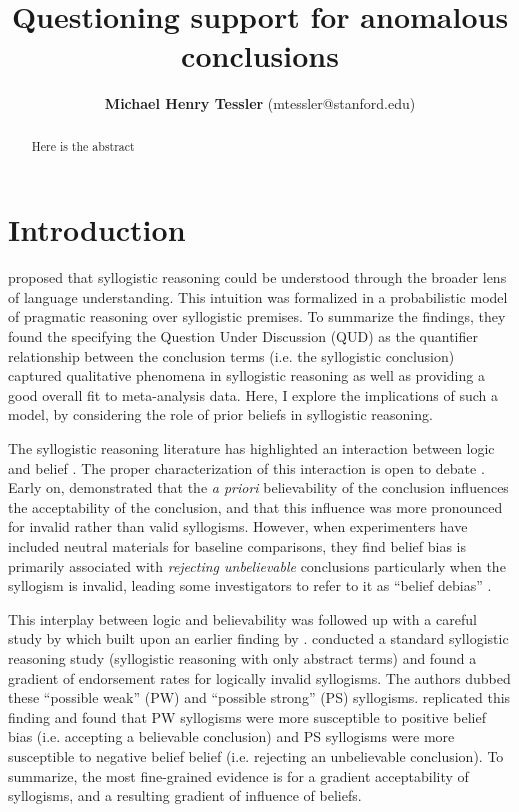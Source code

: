 \documentclass{llncs} %
\title{Questioning support for anomalous conclusions}
\author{{\large \bf Michael Henry Tessler} (mtessler@stanford.edu)}
\institute{Department of Psychology, Stanford University}
\begin{document}
\maketitle


\begin{abstract}
Here is the abstract
\end{abstract}

\section{Introduction}

 proposed that syllogistic reasoning could be understood through the broader lens of language understanding. This intuition was formalized in a probabilistic model of pragmatic reasoning over syllogistic premises. To summarize the findings, they found the specifying the Question Under Discussion (QUD) as the quantifier relationship between the conclusion terms (i.e. the syllogistic conclusion) captured qualitative phenomena in syllogistic reasoning as well as providing a good overall fit to meta-analysis data. Here, I explore the implications of such a model, by considering the role of prior beliefs in syllogistic reasoning.

The syllogistic reasoning literature has highlighted an interaction between logic and belief \cite{Evans1983}. The proper characterization  of this interaction is open to debate \cite{Newstead1993, others}. Early on,  demonstrated that the \emph{a priori} believability of the conclusion influences the acceptability of the conclusion, and that this influence was more pronounced for invalid rather than valid syllogisms. However, when experimenters have included neutral materials for baseline comparisons, they find belief bias is primarily associated with \emph{rejecting unbelievable} conclusions particularly when the syllogism is invalid, leading some investigators to refer to it as ``belief debias'' \cite{Morley2004, Newstead1992}.

This interplay between logic and believability was followed up with a careful study by  which built upon an earlier finding by .  conducted a standard syllogistic reasoning study (syllogistic reasoning with only abstract terms) and found a gradient of endorsement rates for logically invalid syllogisms. The authors dubbed these ``possible weak'' (PW) and ``possible strong'' (PS) syllogisms.  replicated this finding and found that PW syllogisms were more susceptible to positive belief bias (i.e. accepting a believable conclusion) and PS syllogisms were more susceptible to negative belief belief (i.e. rejecting an unbelievable conclusion). To summarize, the most fine-grained evidence is for a gradient acceptability of syllogisms, and a resulting gradient of influence of beliefs. 
\end{document}
